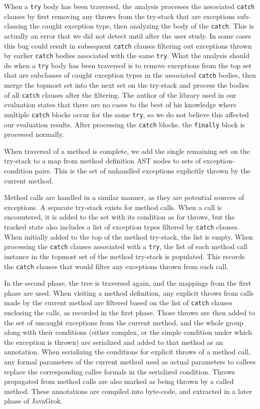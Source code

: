 When a \texttt{try} body has been traversed, the analysis processes the
associated \texttt{catch} clauses by first removing any throws from the
try-stack that are exceptions sub-classing the caught exception type, then
analyzing the body of the \texttt{catch}.  This is actually an error that we did
not detect until after the user study.  In some cases this bug could result in subsequent
\texttt{catch} clauses filtering out exceptions thrown by earlier \texttt{catch}
bodies associated with the same \texttt{try}.
What the analysis should do 
when a \texttt{try} body has been traversed is to
remove exceptions from the top set that are subclasses of caught exception
types in the associated \texttt{catch} bodies,  then merge the topmost set
into the next set on the try-stack and process the bodies of
all \texttt{catch} clauses after the filtering.
The author of the library used in our evaluation states that there are no cases
to the best of his knowledge where multiple \texttt{catch} blocks occur for the
same \texttt{try}, so we do not believe this affected our evaluation results.
After processing the \texttt{catch} blocks, the \texttt{finally} block is
processed normally.

When traversal of a method is complete, we add the
single remaining set on the try-stack to a map from method definition AST
nodes to sets of exception-condition pairs.  This is the set of unhandled
exceptions explicitly thrown by the current method.

Method calls are handled in a similar manner, as they are potential sources of
exceptions.  A separate try-stack exists for method calls.  When a call is
encountered, it is added to the set with its condition as for throws, but the
tracked state also includes a list of exception types filtered by \texttt{catch} clauses.  When
initially added to the top of the method try-stack, the list is empty.  When
processing the \texttt{catch} clauses associated with a \texttt{try}, the list of each
method call instance in the topmost set of the method try-stack is populated.
This records the \texttt{catch} clauses that would filter any exceptions thrown
from each call.

In the second phase, the tree is traversed again, and the mappings from the first
phase are used.  When visiting a method definition, any explicit throws from
calls made by the current method are filtered based on the list of \texttt{catch} clauses
enclosing the calls, as recorded in the first phase.  Those throws are then added to the set of uncaught
exceptions from the current method, and the whole group along with their
conditions (either complex, or the simple condition under
which the exception is thrown) are serialized and added to that method as an
annotation.  When serializing the conditions for explicit throws of a method
call, any formal parameters of the current method used as actual parameters to
callees replace the corresponding callee formals in the serialized condition.
Throws propagated from method calls are also marked as being thrown by a called
method.
These annotations are compiled into byte-code, and extracted in a later phase of
JavaGrok.

